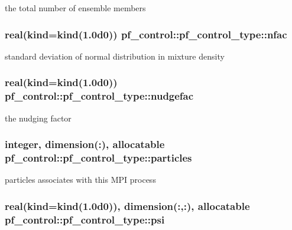 the total number of ensemble members 

\hypertarget{structpf__control_1_1pf__control__type_a77aec7df0491895c8300476fb856b80a}{
\subsubsection[{nfac}]{\setlength{\rightskip}{0pt plus 5cm}real(kind=kind(1.\-0d0)) pf\-\_\-control\-::pf\-\_\-control\-\_\-type\-::nfac}}\label{structpf__control_1_1pf__control__type_a77aec7df0491895c8300476fb856b80a}


standard deviation of normal distribution in mixture density 

\hypertarget{structpf__control_1_1pf__control__type_ae8e8786c073ded3dc39645629863cb73}{
\subsubsection[{nudgefac}]{\setlength{\rightskip}{0pt plus 5cm}real(kind=kind(1.\-0d0)) pf\-\_\-control\-::pf\-\_\-control\-\_\-type\-::nudgefac}}\label{structpf__control_1_1pf__control__type_ae8e8786c073ded3dc39645629863cb73}


the nudging factor 

\hypertarget{structpf__control_1_1pf__control__type_a5a15db12bd5e3ab8163049e4412cf755}{
\subsubsection[{particles}]{\setlength{\rightskip}{0pt plus 5cm}integer, dimension(\-:), allocatable pf\-\_\-control\-::pf\-\_\-control\-\_\-type\-::particles}}\label{structpf__control_1_1pf__control__type_a5a15db12bd5e3ab8163049e4412cf755}


particles associates with this M\-P\-I process 

\hypertarget{structpf__control_1_1pf__control__type_a3e5d92f215b032c3a563de43278c937f}{
\subsubsection[{psi}]{\setlength{\rightskip}{0pt plus 5cm}real(kind=kind(1.\-0d0)), dimension(\-:,\-:), allocatable pf\-\_\-control\-::pf\-\_\-control\-\_\-type\-::psi}}\label{structpf__control_1_1pf__control__type_a3e5d92f215b032c3a563de43278c937f}


